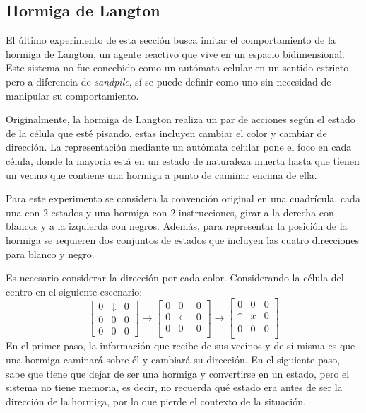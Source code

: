 \subsection{Hormiga de Langton}

El último experimento de esta sección busca imitar el comportamiento de la hormiga de Langton, un agente reactivo que vive en un espacio bidimensional. Este sistema no fue concebido como un autómata celular en un sentido estricto, pero a diferencia de \textit{sandpile}, sí se puede definir como uno sin necesidad de manipular su comportamiento. 

Originalmente, la hormiga de Langton realiza un par de acciones según el estado de la célula que esté pisando, estas incluyen cambiar el color y cambiar de dirección. La representación mediante un autómata celular pone el foco en cada célula, donde la mayoría está en un estado de naturaleza muerta hasta que tienen un vecino que contiene una hormiga a punto de caminar encima de ella.

Para este experimento se considera la convención original en una cuadrícula, cada una con 2 estados y una hormiga con 2 instrucciones, girar a la derecha con blancos y a la izquierda con negros. Además, para representar la posición de la hormiga se requieren dos conjuntos de estados que incluyen las cuatro direcciones para blanco y negro. 

Es necesario considerar la dirección por cada color. Considerando la célula del centro en el siguiente escenario:
\[
\left[
\begin{matrix}
	0 & \downarrow & 0 \\
	0 & 0 & 0 \\
	0 & 0 & 0 
\end{matrix} \right] \rightarrow
\left[ \begin{matrix}
	0 & 0 & 0 \\
	0 & \leftarrow & 0 \\
	0 & 0& 0 \\
\end{matrix}  \right]\rightarrow
\left[ \begin{matrix}
0 & 0 & 0 \\
\uparrow & x & 0 \\
0 & 0& 0 \\
\end{matrix}  \right]
\]
En el primer paso, la información que recibe de sus vecinos y de sí misma es que una hormiga caminará sobre él y cambiará su dirección. En el siguiente paso, sabe que tiene que dejar de ser una hormiga y convertirse en un estado, pero el sistema no tiene memoria, es decir, no recuerda qué estado era antes de ser la dirección de la hormiga, por lo que pierde el contexto de la situación.

